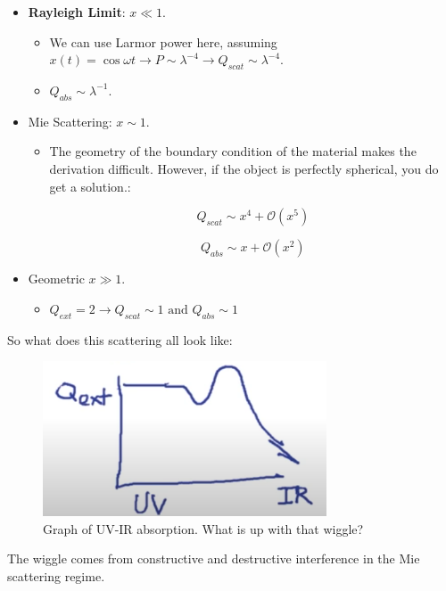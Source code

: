 \documentclass{article}
\begin{document}
\begin{itemize}
    \item \textbf{Rayleigh Limit}: $x\ll1$. 
    \begin{itemize}
        \item We can use Larmor power here, assuming $x(t) = \cos\omega t \rightarrow P \sim \lambda^{-4} \rightarrow  Q_{scat} \sim \lambda^{-4}$.
        \item $Q_{abs} \sim \lambda^{-1}$.
    \end{itemize}
    \item Mie Scattering: $x \sim 1$.
    \begin{itemize}
        \item The geometry of the boundary condition of the material makes the derivation difficult. However, if the object is perfectly spherical, you do get a solution.:
        
        $$
        Q_{scat} \sim x^4 + \mathcal{O}\left(x^5\right)
        $$
        
        $$
        Q_{abs} \sim x + \mathcal{O}\left(x^2\right)
        $$
    \end{itemize}
    \item Geometric $x \gg 1$.
    \begin{itemize}
        \item $Q_{ext} = 2 \rightarrow Q_{scat} \sim 1 \text{ and } Q_{abs} \sim 1$
    \end{itemize}
\end{itemize}

So what does this scattering all look like: 

\begin{figure}
    \centering
    \includegraphics[width=0.75\textwidth]{Screen Shot 2020-11-14 at 4.27.26 PM.png}
    \caption{Graph of UV-IR absorption. What is up with that wiggle?}
    \label{fig:my_label}
\end{figure}

The wiggle comes from constructive and destructive interference in the Mie scattering regime. 
\end{document}
